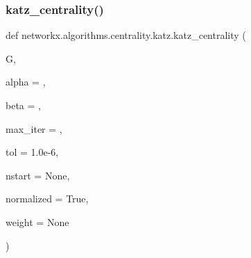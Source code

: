 \subsubsection{\texorpdfstring{katz\+\_\+centrality()}{katz\_centrality()}}
{\footnotesize\ttfamily def networkx.\+algorithms.\+centrality.\+katz.\+katz\+\_\+centrality (\begin{DoxyParamCaption}\item[{}]{G,  }\item[{}]{alpha = {},  }\item[{}]{beta = {},  }\item[{}]{max\+\_\+iter = {},  }\item[{}]{tol = {\ttfamily 1.0e-\/6},  }\item[{}]{nstart = {\ttfamily None},  }\item[{}]{normalized = {\ttfamily True},  }\item[{}]{weight = {\ttfamily None} }\end{DoxyParamCaption})}

